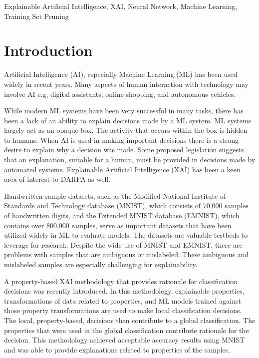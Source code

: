 \documentclass[conference]{IEEEtran}
\begin{document}
\begin{IEEEkeywords}
    Explainable Artificial Intelligence, XAI, Neural Network, Machine Learning, Training Set Pruning
\end{IEEEkeywords}

\section{Introduction}
Artificial Intelligence (AI), especially Machine Learning (ML) has been used
widely in recent years.  Many aspects of human interaction with technology may
involve AI e.g, digital assistants, online shopping, and autonomous vehicles.

While modern ML systems have been very successful in many tasks, there has been
a lack of an ability to explain decisions made by a ML system. ML systems
largely act as an opaque box.  The activity that occurs within the box is hidden
to humans.  When AI is used in making important decisions there is a strong
desire to explain why a decision was made.  Some proposed legislation suggests
that an explanation, suitable for a human, must be provided in decisions made
by automated systems.  Explainable Artificial Intelligence (XAI) has been a keen
area of interest to DARPA\cite{Gunning_Aha_2019} as well.

Handwritten sample datasets, such as the Modified National Institute of
Standards and Technology database (MNIST)\cite{deng2012mnist}, which consists of
70,000 samples of handwritten digits, and the Extended MNIST database\cite{cohen2017emnist}
(EMNIST), which contains over 800,000 samples, serve as
important datasets that have been utilized widely in ML to evaluate models. The
datasets are valuable testbeds to leverage for research. Despite the wide use of
MNIST and EMNIST, there are problems with samples that are ambiguous or
mislabeled.  These ambiguous and mislabeled samples are especially challenging
for explainability.

A property-based XAI methodology\cite{whitten21} that provides rationale for
classification decisions was recently introduced.  In this methodology,
explainable properties, transformations of data related to properties, and ML
models trained against those property transformations are used to make local
classification decisions.  The local, property-based, decisions then contribute
to a global classification.  The properties that were used in the global
classification contribute rationale for the decision.  This methodology achieved
acceptable accuracy results using MNIST and was able to provide explanations
related to properties of the samples.
\end{document}
